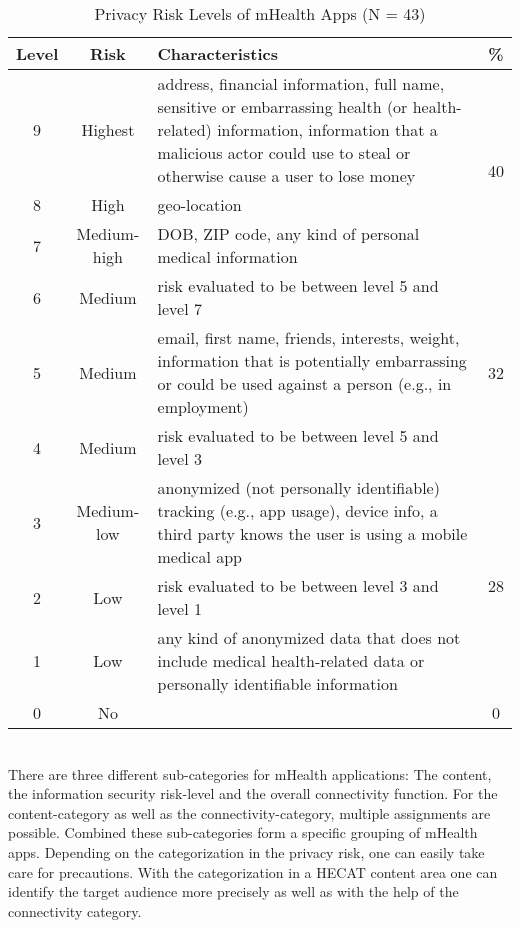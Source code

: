 \begin{table}[!htb]
    \center
    \begin{tabular}{c | c | p{22.5em} | c}
        \textbf{Level} & \textbf{Risk} & \textbf{Characteristics} & \textbf{\%}\\
        \hline
        9 & Highest & address, financial information, full name, sensitive or embarrassing health (or health-related) information, information that a malicious actor could use to steal or otherwise cause a user to lose money & \multirow{3}[20]{*}{40} \\
        \cline{1-3}
        8 & High & geo-location & \\
        \cline{1-3}
        7 & Medium-high & DOB, ZIP code, any kind of personal medical
information & \\
        \hline
        6 & Medium & risk evaluated to be between level 5 and level 7 & \multirow{3}[12]{*}{32} \\
        \cline{1-3}
        5 & Medium & email, first name, friends, interests, weight, information that is potentially embarrassing or could be used against a person (e.g., in employment)\\
        \cline{1-3}
        4 & Medium & risk evaluated to be between level 5 and level 3\\
        \hline
        3 & Medium-low & anonymized (not personally identifiable) tracking (e.g., app usage), device info, a third party knows the user is using a mobile medical app & \multirow{3}[22]{*}{28} \\
        \cline{1-3}
        2 & Low & risk evaluated to be between level 3 and level 1\\
        \cline{1-3}
        1 & Low & any kind of anonymized data that does not include medical
health-related data or personally identifiable information\\
        \hline
        0 & No & & 0 \\
    \end{tabular}
    \caption[Privacy Risk Levels of mHealth Apps]{Privacy Risk Levels of mHealth Apps (N = 43)\footnotemark}
    \label{tab:RiskLevelsmHealth}
\end{table}
\\
There are three different sub-categories for mHealth applications: The content, the information security risk-level and the overall connectivity function. For the content-category as well as the connectivity-category, multiple assignments are possible. Combined these sub-categories form a specific grouping of mHealth apps. Depending on the categorization in the privacy risk, one can easily take care for precautions. With the categorization in a HECAT content area one can identify the target audience more precisely as well as with the help of the connectivity category.

